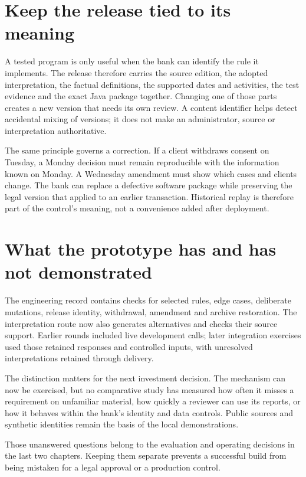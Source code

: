 \section{Keep the release tied to its meaning}

A tested program is only useful when the bank can identify the rule it implements.
The release therefore carries the source edition, the adopted interpretation,
the factual definitions, the supported dates and activities, the test evidence
and the exact Java package together. Changing one of those parts creates a new
version that needs its own review. A content identifier helps detect accidental
mixing of versions; it does not make an administrator, source or interpretation
authoritative.

The same principle governs a correction. If a client withdraws consent on
Tuesday, a Monday decision must remain reproducible with the information known
on Monday. A Wednesday amendment must show which cases and clients change. The
bank can replace a defective software package while preserving the legal version
that applied to an earlier transaction. Historical replay is therefore part of
the control's meaning, not a convenience added after deployment.

\section{What the prototype has and has not demonstrated}

The engineering record contains checks for selected rules, edge cases,
deliberate mutations, release identity, withdrawal, amendment and archive
restoration. The interpretation route now also generates alternatives and
checks their source support. Earlier rounds included live development calls;
later integration exercises used those retained responses and controlled
inputs, with unresolved interpretations retained through delivery.

The distinction matters for the next investment decision. The mechanism can now
be exercised, but no comparative study has measured how often it misses a
requirement on unfamiliar material, how quickly a reviewer can use its reports,
or how it behaves within the bank's identity and data controls. Public sources
and synthetic identities remain the basis of the local demonstrations.

Those unanswered questions belong to the evaluation and operating decisions in
the last two chapters. Keeping them separate prevents a successful build from
being mistaken for a legal approval or a production control.

